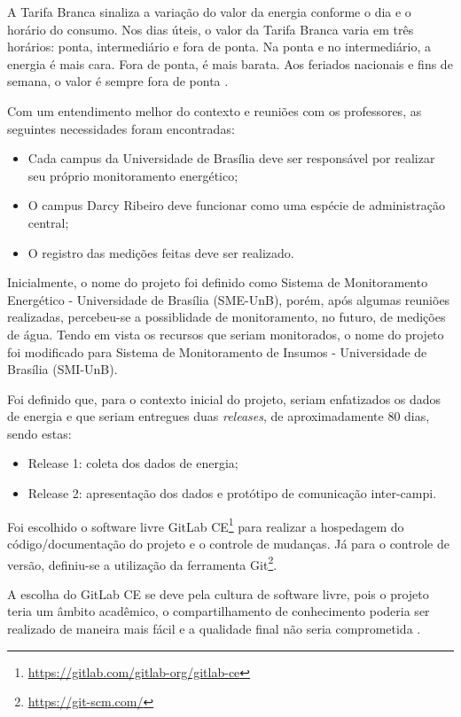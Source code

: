 A Tarifa Branca sinaliza a variação do valor da energia conforme o dia e o horário do consumo. Nos dias úteis, o valor da Tarifa Branca varia em três horários: ponta, intermediário e fora de ponta. Na ponta e no intermediário, a energia é mais cara. Fora de ponta, é mais barata. Aos feriados nacionais e fins de semana, o valor é sempre fora de ponta \cite{aneel}.

Com um entendimento melhor do contexto e reuniões com os professores, as seguintes necessidades foram encontradas:

\begin{itemize}
    \item Cada campus da Universidade de Brasília deve ser responsável por realizar seu próprio monitoramento energético;
    \item O campus Darcy Ribeiro deve funcionar como uma espécie de administração central;
    \item O registro das medições feitas deve ser realizado.
\end{itemize}

Inicialmente, o nome do projeto foi definido como Sistema de Monitoramento Energético - Universidade de Brasília (SME-UnB), porém, após algumas reuniões realizadas, percebeu-se a possiblidade de monitoramento, no futuro, de medições de água. Tendo em vista os recursos que seriam monitorados, o nome do projeto foi modificado para Sistema de Monitoramento de Insumos - Universidade de Brasília (SMI-UnB).

Foi definido que, para o contexto inicial do projeto, seriam enfatizados os dados de energia e que seriam entregues duas \textit{releases}, de aproximadamente 80 dias, sendo estas:

\begin{itemize}
    \item Release 1: coleta dos dados de energia;
    \item Release 2: apresentação dos dados e protótipo de comunicação inter-campi.
\end{itemize}

Foi escolhido o software livre GitLab CE\footnote{\url{https://gitlab.com/gitlab-org/gitlab-ce}} para realizar a hospedagem do código/documentação do projeto e o controle de mudanças. Já para o controle de versão, definiu-se a utilização da ferramenta Git\footnote{\url{https://git-scm.com/}}.

A escolha do GitLab CE se deve pela cultura de software livre, pois o projeto teria um âmbito acadêmico, o compartilhamento de conhecimento poderia ser realizado de maneira mais fácil e a qualidade final não seria comprometida \cite{raymond1999}.

